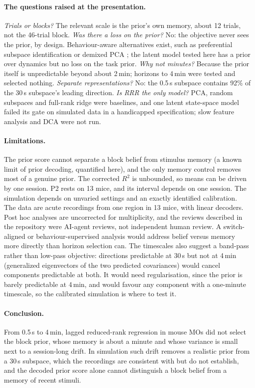 \documentclass{article}
\begin{document}
\paragraph{The questions raised at the presentation.} \emph{Trials or blocks?} The relevant scale is the prior's own
memory, about 12 trials, not the 46-trial block. \emph{Was there a loss on the prior?} No: the objective never sees the
prior, by design. Behaviour-aware alternatives exist, such as preferential subspace identification
\citep{sani2021} or demixed PCA \citep{kobak2016}; the latent model tested here has a prior over dynamics but no loss on
the task prior. \emph{Why not minutes?} Because the prior itself is unpredictable beyond about 2\,min; horizons to 4\,min
were tested and selected nothing. \emph{Separate representations?} No: the 0.5\,s subspace contains 92\% of the 30\,s
subspace's leading direction. \emph{Is RRR the only model?} PCA, random subspaces and full-rank ridge were baselines, and one
latent state-space model failed its gate on simulated data in a handicapped specification; slow feature analysis
\citep{wiskott2002} and DCA \citep{clark2019} were not run.

\paragraph{Limitations.} The prior score cannot separate a block belief from stimulus memory (a known limit of prior
decoding, quantified here), and the only memory control removes most of a genuine prior. The corrected $R^2$ is
unbounded, so means can be driven by one session. P2 rests on 13 mice, and its interval depends on one session. The
simulation depends on unvaried settings and an exactly identified calibration. The data are acute recordings from one region in 13 mice, with linear decoders.
Post hoc analyses are uncorrected for multiplicity, and the reviews described in the repository were AI-agent
reviews, not independent human review. A switch-aligned or behaviour-supervised analysis would address belief versus
memory more directly than horizon selection can. The timescales also suggest a band-pass rather than low-pass
objective: directions predictable at 30\,s but not at 4\,min (generalized eigenvectors of the two predicted covariances)
would cancel components predictable at both. It would need regularisation, since the prior is barely predictable at
4\,min, and would favour any component with a one-minute timescale, so the calibrated simulation is where to test it.

\paragraph{Conclusion.} From 0.5\,s to 4\,min, lagged reduced-rank regression in mouse MOs did not select the block
prior, whose memory is about a minute and whose variance is small next to a session-long drift. In simulation such
drift removes a realistic prior from a 30\,s subspace, which the recordings are consistent with but do not establish,
and the decoded prior score alone cannot distinguish a block belief from a memory of recent stimuli.
\end{document}
